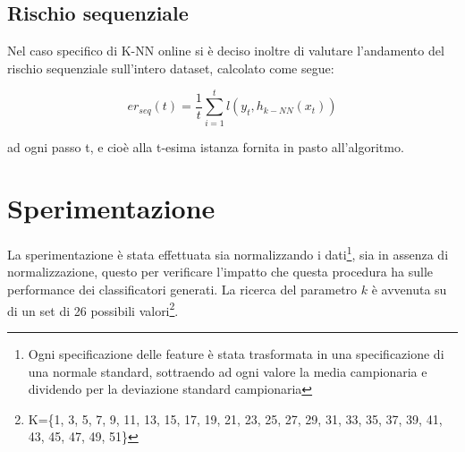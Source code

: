 \documentclass[fleqn,10pt]{SelfArx} %
\begin{document}
\subsection{Rischio sequenziale}
Nel caso specifico di K-NN online si è deciso inoltre di valutare l'andamento del rischio sequenziale sull'intero dataset, calcolato come segue:

\[
er_{seq}(t)=\frac{1}{t}\sum_{i=1}^{t} l(y_t,h_{k-NN}(x_t))
\]

ad ogni passo t, e cioè alla t-esima istanza fornita in pasto all'algoritmo.
\section{Sperimentazione}
La sperimentazione è stata effettuata sia normalizzando i dati\footnote{\footnotesize{Ogni specificazione delle feature è stata trasformata in una specificazione di una normale standard, sottraendo ad ogni valore la media campionaria e dividendo per la deviazione standard campionaria}}, sia in assenza di normalizzazione, questo per verificare l'impatto che questa procedura ha sulle performance dei classificatori generati.
\newline
\newline
La ricerca del parametro $k$ è avvenuta su di un set di 26 possibili valori\footnote{\footnotesize{K=\{1, 3, 5, 7, 9, 11, 13, 15, 17, 19, 21, 23, 25, 27, 29, 31, 33, 35, 37, 39, 41, 43, 45, 47, 49, 51\}}}.
\end{document}
